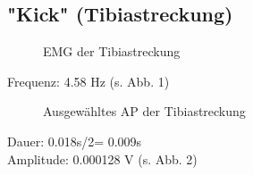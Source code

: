 \subsection{"{}Kick"{} (Tibiastreckung)}
\begin{figure}[H]
\caption{EMG der Tibiastreckung}
\label{kick}
\end{figure}
Frequenz: 4.58 Hz (s. Abb. 1)

\begin{figure}[H]
\caption{Ausgewähltes AP der Tibiastreckung}
\label{kick-ap}
\end{figure}

Dauer: 0.018s/2= 0.009s\\
Amplitude: 0.000128 V (s. Abb. 2)

